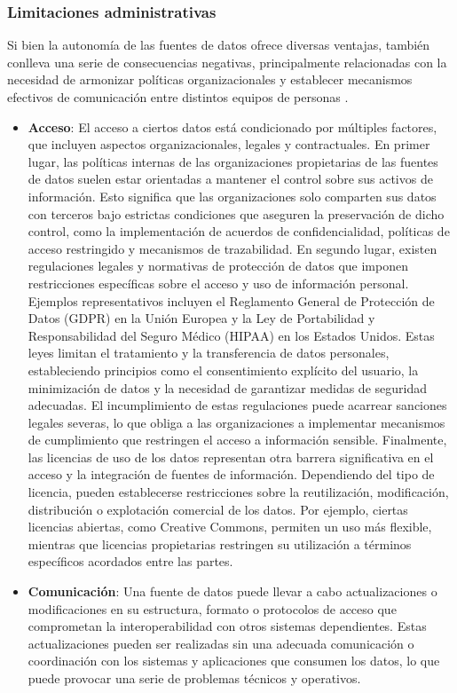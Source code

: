     \subsubsection{Limitaciones administrativas}

    Si bien la autonomía de las fuentes de datos ofrece diversas ventajas, también conlleva una serie de consecuencias negativas, principalmente relacionadas con la necesidad de armonizar políticas organizacionales y establecer mecanismos efectivos de comunicación entre distintos equipos de personas \cite{miller2018open, mcleod1980federated}.

    \begin{itemize}
        \item \textbf{Acceso}: El acceso a ciertos datos está condicionado por múltiples factores, que incluyen aspectos organizacionales, legales y contractuales. En primer lugar, las políticas internas de las organizaciones propietarias de las fuentes de datos suelen estar orientadas a mantener el control sobre sus activos de información. Esto significa que las organizaciones solo comparten sus datos con terceros bajo estrictas condiciones que aseguren la preservación de dicho control, como la implementación de acuerdos de confidencialidad, políticas de acceso restringido y mecanismos de trazabilidad.
        En segundo lugar, existen regulaciones legales y normativas de protección de datos que imponen restricciones específicas sobre el acceso y uso de información personal. Ejemplos representativos incluyen el Reglamento General de Protección de Datos (GDPR) en la Unión Europea y la Ley de Portabilidad y Responsabilidad del Seguro Médico (HIPAA) en los Estados Unidos. Estas leyes limitan el tratamiento y la transferencia de datos personales, estableciendo principios como el consentimiento explícito del usuario, la minimización de datos y la necesidad de garantizar medidas de seguridad adecuadas. El incumplimiento de estas regulaciones puede acarrear sanciones legales severas, lo que obliga a las organizaciones a implementar mecanismos de cumplimiento que restringen el acceso a información sensible.
        Finalmente, las licencias de uso de los datos representan otra barrera significativa en el acceso y la integración de fuentes de información. Dependiendo del tipo de licencia, pueden establecerse restricciones sobre la reutilización, modificación, distribución o explotación comercial de los datos. Por ejemplo, ciertas licencias abiertas, como Creative Commons, permiten un uso más flexible, mientras que licencias propietarias restringen su utilización a términos específicos acordados entre las partes.
        \item \textbf{Comunicación}: Una fuente de datos puede llevar a cabo actualizaciones o modificaciones en su estructura, formato o protocolos de acceso que comprometan la interoperabilidad con otros sistemas dependientes. Estas actualizaciones pueden ser realizadas sin una adecuada comunicación o coordinación con los sistemas y aplicaciones que consumen los datos, lo que puede provocar una serie de problemas técnicos y operativos.
    \end{itemize}


